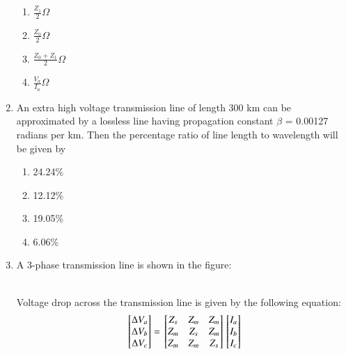 \documentclass[journal]{IEEEtran}
\begin{document}
\begin{enumerate}
\begin{enumerate}
   \item $\frac{Z_1}{2} \Omega$
   \item $\frac{Z_0}{2} \Omega$
   \item $\frac{Z_0+Z_1}{2} \Omega$
   \item $\frac{V_a}{I_a} \Omega$ \\
\end{enumerate}
\item An extra high voltage transmission line of length 300 km can be approximated by a lossless line having propagation constant $\beta$ = 0.00127 radians per km. Then the percentage ratio of line length to wavelength will be given by
\begin{enumerate}
    \item 24.24\%
    \item 12.12\%
    \item 19.05\%
    \item 6.06\% \\
\end{enumerate}
\item A 3-phase transmission line is shown in the figure:\\
\begin{figure}[!ht]
\centering
\resizebox{0.3\textwidth}{!}{%

}%
\end{figure}
\begin{figure}[!ht]
\centering
\resizebox{0.3\textwidth}{!}{%

}%
\end{figure}
\begin{figure}[!ht]
\centering
\resizebox{0.3\textwidth}{!}{%

}%
\end{figure}\\
Voltage drop across the transmission line is given by the following equation:
\begin{align*}
    {}\left[\begin{matrix}
        \Delta V_a \\ \Delta V_b \\ \Delta V_c
    \end{matrix}\right] = {}\left[\begin{matrix}
        Z_s & Z_m & Z_m \\Z_m & Z_s & Z_m \\ Z_m & Z_m & Z_s
    \end{matrix}\right]{}\left[\begin{matrix}
        I_a \\ I_b \\ I_c

\end{matrix}\right]
\end{align*}
\end{enumerate}
\end{document}
